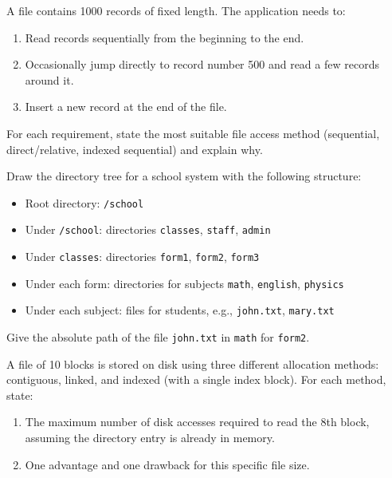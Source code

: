 \documentclass[11pt]{article}
\begin{document}
\begin{exercice}
A file contains 1000 records of fixed length. The application needs to:
\begin{enumerate}
\item Read records sequentially from the beginning to the end.
\item Occasionally jump directly to record number 500 and read a few records around it.
\item Insert a new record at the end of the file.
\end{enumerate}
For each requirement, state the most suitable file access method (sequential, direct/relative, indexed sequential) and explain why.
\end{exercice}

\begin{exercice}
Draw the directory tree for a school system with the following structure:
\begin{itemize}
\item Root directory: \texttt{/school}
\item Under \texttt{/school}: directories \texttt{classes}, \texttt{staff}, \texttt{admin}
\item Under \texttt{classes}: directories \texttt{form1}, \texttt{form2}, \texttt{form3}
\item Under each form: directories for subjects \texttt{math}, \texttt{english}, \texttt{physics}
\item Under each subject: files for students, e.g., \texttt{john.txt}, \texttt{mary.txt}
\end{itemize}
Give the absolute path of the file \texttt{john.txt} in \texttt{math} for \texttt{form2}.
\end{exercice}

\begin{exercice}
A file of 10 blocks is stored on disk using three different allocation methods: contiguous, linked, and indexed (with a single index block). For each method, state:
\begin{enumerate}
\item The maximum number of disk accesses required to read the 8th block, assuming the directory entry is already in memory.
\item One advantage and one drawback for this specific file size.
\end{enumerate}
\end{exercice}
\end{document}
